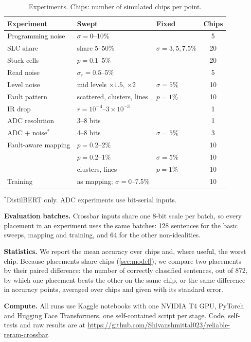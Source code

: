 \begin{table}[t]
\centering\footnotesize
\caption{Experiments. Chips: number of simulated chips per point.}\label{tab:experiments}
\setlength{\tabcolsep}{2.5pt}
\begin{tabular}{@{}lll c@{}}
\toprule
Experiment & Swept & Fixed & Chips \\
\midrule
Programming noise & $\sigma=0$--10\% & & 5 \\
SLC share & share 5--50\% & $\sigma=3,5,7.5\%$ & 20 \\
Stuck cells & $p=0.1$--5\% & & 20 \\
Read noise & $\sigma_r=0.5$--5\% & & 5 \\
Level noise & mid levels $\times1.5$, $\times2$ & $\sigma=5\%$ & 10 \\
Fault pattern & scattered, clusters, lines & $p=1\%$ & 10 \\
IR drop & $r=10^{-4}$--$3\times10^{-3}$ & & 1 \\
ADC resolution & 3--8 bits & & 1 \\
ADC + noise$^{*}$ & 4--8 bits & $\sigma=5\%$ & 3 \\
\midrule
Fault-aware mapping & $p=0.2$--2\% & & 10 \\
 & $p=0.2$--1\% & $\sigma=5\%$ & 10 \\
 & clusters, lines & $p=1\%$ & 10 \\
\midrule
Training & as mapping; $\sigma=0$--7.5\% & & 10 \\
\bottomrule
\end{tabular}

\smallskip
\raggedright$^{*}$DistilBERT only. ADC experiments use bit-serial inputs.
\end{table}

\textbf{Evaluation batches.} Crossbar inputs share one 8-bit scale per batch, so every placement in an
experiment uses the same batches: 128 sentences for the basic sweeps, mapping and training, and 64 for
the other non-idealities.

\textbf{Statistics.} We report the mean accuracy over chips and, where useful, the worst chip. Because
placements share chips (\cref{sec:model}), we compare two placements by their paired difference: the
number of correctly classified sentences, out of 872, by which one placement beats the other on the same
chip, or the same difference in accuracy points, averaged over chips and given with its standard error.

\textbf{Compute.} All runs use Kaggle notebooks with one NVIDIA T4 GPU, PyTorch and Hugging Face
Transformers, one self-contained script per stage. Code, self-tests and raw results are at
\url{https://github.com/Shivanshmittal023/reliable-reram-crossbar}.
